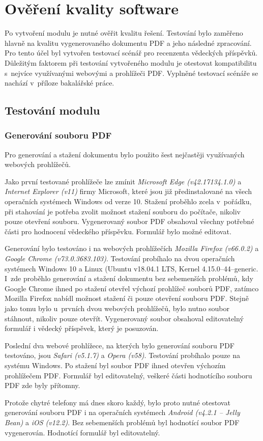 \chapter{Ověření kvality software}
Po vytvoření modulu je nutné ověřit kvalitu řešení. Testování bylo zaměřeno hlavně na kvalitu vygenerovaného dokumentu PDF a jeho následné zpracování. Pro tento účel byl vytvořen testovací scénář pro recenzenta vědeckých příspěvků. Důležitým faktorem při testování vytvořeného modulu je otestovat kompatibilitu s~nejvíce využívanými webovými a prohlížeči PDF. Vyplněné testovací scénáře se nachází v~příloze bakalářské práce.

\section{Testování modulu}

\subsection{Generování souboru PDF}
Pro generování a stažení dokumentu bylo použito šest nejčastěji využívaných webových prohlížečů.
\par
Jako první testované prohlížeče lze zmínit \textit{Microsoft Edge (v42.17134.1.0)} a \textit{Internet Explorer (v11)} firmy Microsoft, které jsou již předinstalované na všech operačních systémech Windows od verze 10. Stažení proběhlo zcela v~pořádku, při stahování je potřeba zvolit možnost stažení souboru do počítače, nikoliv pouze otevření souboru. Vygenerovaný soubor PDF obsahoval všechny potřebné části pro hodnocení vědeckého příspěvku. Formulář bylo možné editovat.
\par
Generování bylo testováno i na webových prohlížečích \textit{Mozilla Firefox (v66.0.2)} a \textit{Google Chrome (v73.0.3683.103)}. Testování probíhalo na dvou operačních systémech Windows 10 a Linux (Ubuntu v18.04.1 LTS, Kernel 4.15.0--44--generic. I~zde proběhlo generování a stažení dokumentu bez sebemenších problémů, kdy Google Chrome ihned po stažení otevřel výchozí prohlížeč souborů PDF, zatímco Mozilla Firefox nabídl možnost stažení či pouze otevření souboru PDF. Stejně jako tomu bylo u~prvních dvou webových prohlížečů, bylo nutno soubor stáhnout, nikoliv pouze otevřít. Vygenerovaný soubor obsahoval editovatelný formulář i vědecký příspěvek, který je posuzován.
\par
Poslední dva webové prohlížece, na kterých bylo generování souboru PDF testováno, jsou \textit{Safari (v5.1.7)} a \textit{Opera (v58)}. Testování probíhalo pouze na systému Windows. Po stažení byl soubor PDF ihned otevřen výchozím prohlížečem PDF. Formulář byl editovatelný, veškeré části hodnotícího souboru PDF zde byly přítomny.
\par
Protože chytré telefony má dnes skoro každý, bylo proto nutné otestovat generování souboru PDF i na operačních systémech \textit{Android (v4.2.1 -- Jelly Bean)} a \textit{iOS (v12.2)}. Bez sebemenších problémů byl hodnotící soubor PDF vygenerován. Hodnotící formulář byl editovatelný.


